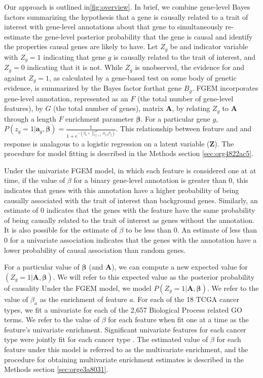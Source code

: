 Our approach is outlined in\ref{fig:overview}. In brief, we combine gene-level Bayes factors summarizing the hypothesis that a gene is causally related to a trait of interest with gene-level annotations about that gene to simultaneously re-estimate the gene-level posterior probability that the gene is causal and identify the properties causal genes are likely to have.  Let $Z_g$ be and indicator variable with $Z_g = 1$ indicating that gene $g$ is causally related to the trait of interest, and $Z_g = 0$ indicating that it is not.  While $Z_g$ is unobserved, the evidence for and against $Z_g=1$, as calculated by a gene-based test on some body of genetic evidence, is summarized by the Bayes factor forthat gene $B_g$.  FGEM incorporates gene-level annotation, represented as an $F$ (the total number of gene-level features), by $G$ (the total number of genes), matrix $\textbf{A}$, by relating $Z_g$ to $\textbf{A}$ through a length $F$  enrichment parameter $\boldsymbol{\beta}$.  For a particular gene $g$, $P(z_g=1|\textbf{a}_g,\boldsymbol{\beta}) =  \frac{1}{1+e^{-(\beta_{0}+\sum_{f=1}^F{A_{f,g}\beta_f})}} $.  This relationship between feature and and response is
analagous to a logistic regression on a latent variable ($\textbf{Z}$).  The procedure for model fitting is described in the Methods section \ref{sec:org4822ac5}.

Under the univariate FGEM model, in which each feature is considered one at at time, if the value of $\beta$ for a binary gene-level annotation is greater than $0$, this indicates that genes with this annotation have a higher probability of being causally associated with the trait of interest than background genes.  Similarly, an estimate of $0$ indicates that the genes with the feature have the same probability of being causally related to the trait of interest as genes without the annotation.  It is also possible for the estimate of $\beta$ to be less than $0$.  An estimate of less than 0 for a univariate association indicates that the genes with the annotation have a lower probability of causal association than random genes.

For a particular value of $\boldsymbol{\beta}$ (and $\textbf{A}$), we can compute a new expected value for $(Z_g = 1 | \textbf{A},\boldsymbol{\beta})$.  We will refer to this expected value as the posterior probability of causality      Under the FGEM model, we model $P(Z_g = 1 | \textbf{A},\boldsymbol{\beta})$.  We refer to the value of $\beta_a$ as the enrichment of feature $a$.  For each of the 18 TCGA cancer types, we fit a univariate for each of the 2,657 Biological Process related GO terms.  We refer to the value of $\beta$ for each feature when fit one at a time as the feature's univariate enrichment.  Significant univariate features for each cancer type were jointly fit for each cancer type .  The estimated value of $\beta$ for each feature under this model is referred to as the multivariate enrichment, and the procedure for obtaining multivariate enrichment estimates is described in the Methods section \ref{sec:orge3a8031}.

